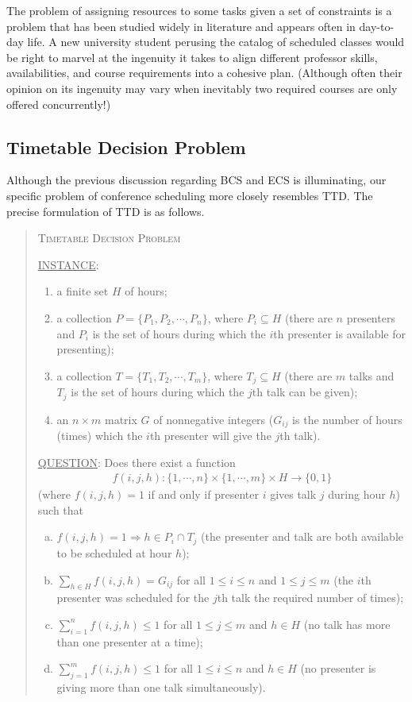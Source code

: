 \documentclass[]{article}
\theoremstyle{definition}
\theoremstyle{remark}
\numberwithin{equation}{section}
\begin{document}
The problem of assigning resources to some tasks given a set of constraints is a problem that has been studied widely in literature and appears often in day-to-day life. A new university student perusing the catalog of scheduled classes would be right to marvel at the ingenuity it takes to align different professor skills, availabilities, and course requirements into a cohesive plan. (Although often their opinion on its ingenuity may vary when inevitably two required courses are only offered concurrently!)  

\subsection{Timetable Decision Problem}
Although the previous discussion regarding BCS and ECS is illuminating, our specific problem of conference scheduling more closely resembles TTD. The precise formulation of TTD is as follows.
\begin{quote}
	\textsc{Timetable Decision Problem}
	
	\underline{INSTANCE}:
	\begin{enumerate}
		\item a finite set $H$ of hours;
		\item a collection $P = \{P_1, P_2, \cdots, P_n\}$, where $P_i \subseteq H$ (there are $n$ presenters and $P_i$ is the set of hours during which the $i$th presenter is available for presenting);
		\item a collection $T = \{T_1, T_2, \cdots, T_m\}$, where $T_j \subseteq H$ (there are $m$ talks and $T_j$ is the set of hours during which the $j$th talk can be given);
		\item an $n \times m$ matrix $G$ of nonnegative integers ($G_{ij}$ is the number of hours (times) which the $i$th presenter will give the $j$th talk).
	\end{enumerate}
	\underline{QUESTION}: Does there exist a function 
	\begin{gather*}
		f(i,j,h) : \{1,\cdots,n\} \times \{1,\cdots,m\} \times H \rightarrow \{0,1\}
	\end{gather*}
	(where $f(i,j,h)=1$ if and only if presenter $i$ gives talk $j$ during hour $h$) such that
	\begin{enumerate}[(a)]
		\item $f(i,j,h) = 1 \Rightarrow h \in P_i \cap T_j$ (the presenter and talk are both available to be scheduled at hour $h$);
		\item $\sum\limits_{h \in H} f(i,j,h) = G_{ij}$ for all $1 \le i \le n$ and $1 \le j \le m$ (the $i$th presenter was scheduled for the $j$th talk the required number of times);
		\item $\sum\limits_{i=1}^n f(i,j,h) \le 1$ for all $1 \le j \le m$ and $h \in H$ (no talk has more than one presenter at a time);
		\item $\sum\limits_{j=1}^m f(i,j,h) \le 1$ for all $1 \le i \le n$ and $h \in H$ (no presenter is giving more than one talk simultaneously).
	\end{enumerate}
\end{quote}
\end{document}
